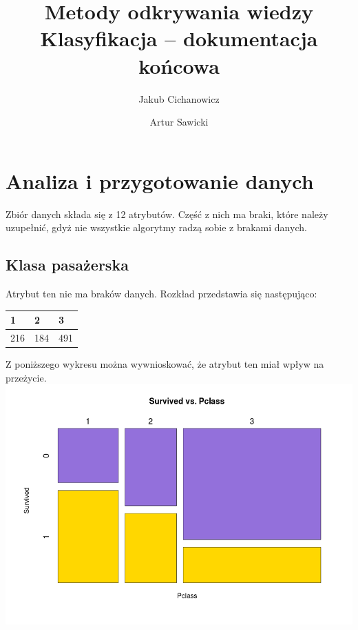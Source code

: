 \documentclass{article}
\begin{document}
\title{Metody odkrywania wiedzy \\%
{\large Klasyfikacja -- dokumentacja końcowa} }

\author{Jakub Cichanowicz \and Artur Sawicki}

\maketitle

\section{Analiza i przygotowanie danych}
Zbiór danych składa się z 12 atrybutów. Część z nich ma braki, które należy uzupełnić, gdyż nie wszystkie algorytmy radzą sobie z brakami danych.

\subsection{Klasa pasażerska}

Atrybut ten nie ma braków danych. Rozkład przedstawia się następująco:
\begin{center}
    \begin{tabular}{| l | l | l |}
    \hline
	1   & 2  & 3 \\ \hline
    216 & 184 & 491 \\
    \hline
    \end{tabular}
\end{center}

Z poniższego wykresu można wywnioskować, że atrybut ten miał wpływ na przeżycie.\\
\includegraphics[scale=0.4]{images/survived-vs-pclass.png}
\end{document}
